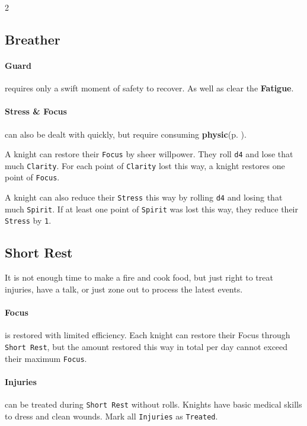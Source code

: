 
\label{sec:recovery}

\begin{multicols*}{2}

\subsection*{Breather}

\paragraph{Guard} requires only a swift moment of safety to recover. As well as clear the \textbf{Fatigue}.

\paragraph{Stress \& Focus} can also be dealt with quickly, but require consuming \textbf{physic}(p. \pageref*{sec:gear}).

A knight can restore their \texttt{Focus} by sheer willpower. They roll \texttt{d4} and lose that much \texttt{Clarity}. 
For each point of \texttt{Clarity} lost this way, a knight restores one point of \texttt{Focus}.

A knight can also reduce their \texttt{Stress} this way by rolling \texttt{d4} and losing that much \texttt{Spirit}.
If at least one point of \texttt{Spirit} was lost this way, they reduce their \texttt{Stress} by \texttt{1}.

\subsection*{Short Rest}

It is not enough time to make a fire and cook food, but just right to treat injuries, have a talk, or just zone out to process the latest events.

\paragraph{Focus} is restored with limited efficiency. 
Each knight can restore their Focus through \texttt{Short Rest}, but the amount restored this way in total per day cannot exceed their maximum \texttt{Focus}.

\paragraph{Injuries} can be treated during \texttt{Short Rest} without rolls. 
Knights have basic medical skills to dress and clean wounds. 
Mark all \texttt{Injuries} as \texttt{Treated}.



\end{multicols*}
